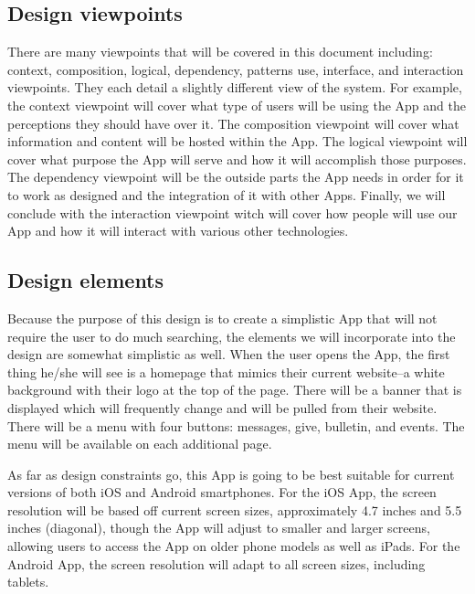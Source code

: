 \documentclass[letterpaper,10pt,draftclsnofoot,onecolumn,titlepage]{IEEEtran}
\begin{document}
		\subsection{Design viewpoints}
		There are many viewpoints that will be covered in this document including: context, composition, logical, dependency, patterns use, interface, and interaction viewpoints.
		They each detail a slightly different view of the system.
		 For example, the context viewpoint will cover what type of users will be using the \gls{App} and the perceptions they should have over it.
		The composition viewpoint will cover what information and content will be hosted within the \gls{App}.
		The logical viewpoint will cover what purpose the \gls{App} will serve and how it will accomplish those purposes.
		The dependency viewpoint will be the outside parts the \gls{App} needs in order for it to work as designed and the integration of it with other \glspl{App}.
		Finally, we will conclude with the interaction viewpoint witch will cover how people will use our \gls{App} and how it will interact with various other technologies.

		\subsection{Design elements}
		Because the purpose of this design is to create a simplistic \gls{App} that will not require the user to do much searching, the elements we will incorporate into the design are somewhat simplistic as well.
		When the user opens the \gls{App}, the first thing he/she will see is a homepage that mimics their current website--a white background with their logo at the top of the page.
		There will be a banner that is displayed which will frequently change and will be pulled from their website.
		There will be a menu with four buttons: messages, give, bulletin, and events.
		The menu will be available on each additional page.

		As far as design constraints go, this \gls{App} is going to be best suitable for current versions of both \gls{iOS} and \gls{Android} smartphones.
		For the \gls{iOS} \gls{App}, the screen resolution will be based off current screen sizes, approximately 4.7 inches and 5.5 inches (diagonal), though the \gls{App} will adjust to smaller and larger screens, allowing users to access the \gls{App} on older phone models as well as iPads.
		For the \gls{Android} \gls{App}, the screen resolution will adapt to all screen sizes, including tablets.
\end{document}
